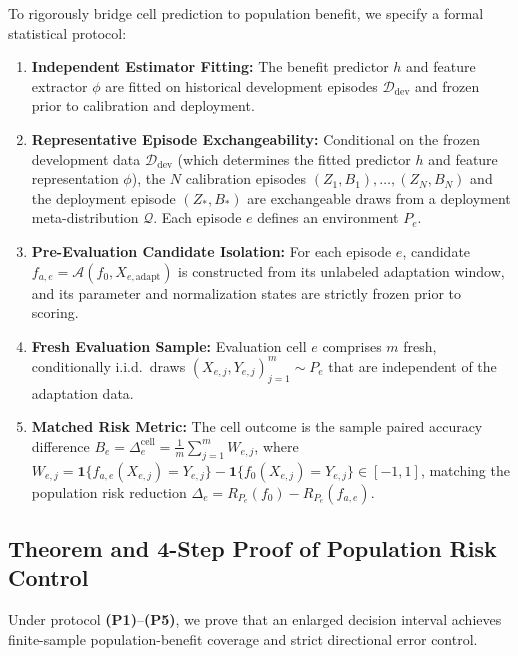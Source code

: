 To rigorously bridge cell prediction to population benefit, we specify a formal statistical protocol:
\begin{enumerate}[label=\textbf{(P\arabic*)}]
 \item \textbf{Independent Estimator Fitting:} The benefit predictor $h$ and feature extractor $\phi$ are fitted
 on historical development episodes $\mathcal D_{\mathrm{dev}}$ and frozen prior to calibration and deployment.
 \item \textbf{Representative Episode Exchangeability:} Conditional on the frozen development
 data $\mathcal D_{\mathrm{dev}}$ (which determines the fitted predictor $h$ and feature representation $\phi$),
 the $N$ calibration episodes $(Z_1, B_1), \dots, (Z_N, B_N)$ and the deployment episode $(Z_*, B_*)$
 are exchangeable draws from a deployment meta-distribution $\mathcal Q$. Each episode $e$ defines an environment $P_e$.
 \item \textbf{Pre-Evaluation Candidate Isolation:} For each episode $e$, candidate $f_{a,e} = \mathcal A(f_0, X_{e, \mathrm{adapt}})$
 is constructed from its unlabeled adaptation window, and its parameter and normalization states are strictly
 frozen prior to scoring.
 \item \textbf{Fresh Evaluation Sample:} Evaluation cell $e$ comprises $m$ fresh, conditionally i.i.d.\ draws
 $(X_{e,j}, Y_{e,j})_{j=1}^m \sim P_e$ that are independent of the adaptation data.
 \item \textbf{Matched Risk Metric:} The cell outcome is the sample paired accuracy difference
 $B_e = \Delta_e^{\mathrm{cell}} = \frac{1}{m}\sum_{j=1}^m W_{e,j}$, where
 $W_{e,j} = \mathbf 1\{f_{a,e}(X_{e,j}) = Y_{e,j}\} - \mathbf 1\{f_0(X_{e,j}) = Y_{e,j}\} \in [-1, 1]$,
 matching the population risk reduction $\Delta_e = R_{P_e}(f_0) - R_{P_e}(f_{a,e})$.
\end{enumerate}

\subsection{Theorem and 4-Step Proof of Population Risk Control}
\label{app:transfer-proof}

Under protocol \textbf{(P1)}--\textbf{(P5)}, we prove that an enlarged decision interval achieves finite-sample
population-benefit coverage and strict directional error control.

